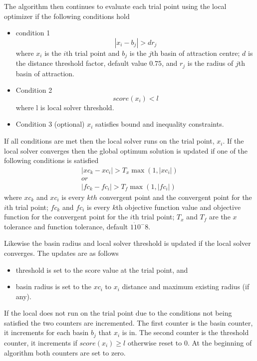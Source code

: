 The algorithm then continues to evaluate each trial point using the local optimizer if the following conditions hold


\begin{itemize}
\item condition 1
    \begin{equation}
        \label{eq:condition1}
        | x_i - b_j | > dr_j
    \end{equation}
        where $x_i$ is the $i$th trial point and $b_j$ is the $j$th basin of attraction centre; $d$ is the distance threshold factor, default value $0.75$, and $r_j$ is the radius of $j$th basin of attraction. 
    \item Condition 2 \[ score(x_i) < l\] where l is local solver threshold.
    \item Condition 3 (optional) $x_i$ satisfies bound and inequality constraints.
\end{itemize}
If all conditions are met then the local solver runs on the trial point, $x_i$. If the local solver converges then the global optimum solution is updated if one of the following conditions is satisfied
\begin{align}
    \label{eq:updateglobal}
    |xc_k - xc_i | > T_x \max ( 1,|xc_i| ) \nonumber \\ 
    or \\
    |fc_k - fc_i | > T_f \max ( 1,|fc_i| )  \nonumber
\end{align}
where $xc_k$ and $xc_i$ is every $kth$ convergent point and the convergent point for the $i$th trial point; $fc_k$ and $fc_i$ is every $k$th objective function value and objective function for the convergent point for the $i$th trial point; $T_x$ and $T_f$ are the $x$ tolerance and function tolerance, default $1\dot 10^-8$. 

Likewise the basin radius and local solver threshold is updated if the local solver converges. The updates are as follows
\begin{itemize}
    \item threshold is set to the score value at the trial point, and
    \item basin radius is set to the $xc_i$ to $x_i$ distance and maximum existing radius (if any).
\end{itemize}

If the local does not run on the trial point due to the conditions not being satisfied the two counters are incremented. The first counter is the basin counter, it increments for each basin $b_j$ that $x_i$ is in. The second counter is the threshold counter, it increments if $score(x_i) \geq l$ otherwise reset to 0. At the beginning of algorithm both counters are set to zero. 

